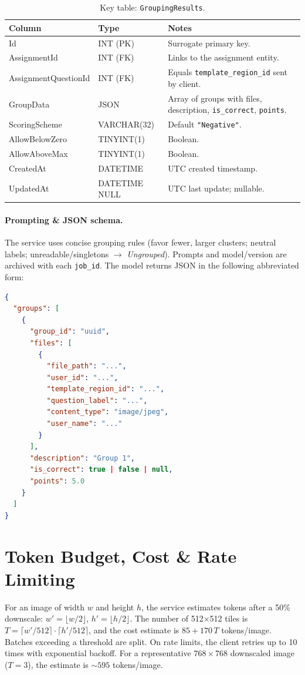 \documentclass[ms,twoside,print]{nuthesis}
\begin{document}
\begin{table}[H]
  \centering
  \caption{Key table: \texttt{GroupingResults}.}
  \label{tab:groupingresults}
  \setlength\tabcolsep{6pt}
  \renewcommand{\arraystretch}{1.2}
  \footnotesize
  \begin{tabularx}{\textwidth}{@{}L{4.3cm}L{2.8cm}Y@{}}
    \toprule
    \textbf{Column} & \textbf{Type} & \textbf{Notes} \\
    \midrule
    Id & INT (PK) & Surrogate primary key. \\
    AssignmentId & INT (FK) & Links to the assignment entity. \\
    AssignmentQuestionId & INT (FK) & Equals \texttt{template\_region\_id} sent by client. \\
    GroupData & JSON & Array of groups with files, description, \texttt{is\_correct}, \texttt{points}. \\
    ScoringScheme & VARCHAR(32) & Default \texttt{"Negative"}. \\
    AllowBelowZero & TINYINT(1) & Boolean. \\
    AllowAboveMax & TINYINT(1) & Boolean. \\
    CreatedAt & DATETIME & UTC created timestamp. \\
    UpdatedAt & DATETIME NULL & UTC last update; nullable. \\
    \bottomrule
  \end{tabularx}
\end{table}

\paragraph{Prompting \& JSON schema.}
The service uses concise grouping rules (favor fewer, larger clusters; neutral labels; unreadable/singletons $\rightarrow$ \emph{Ungrouped}). Prompts and model/version are archived with each \texttt{job\_id}. The model returns JSON in the following abbreviated form:
\begin{lstlisting}[language=json]
{
  "groups": [
    {
      "group_id": "uuid",
      "files": [
        {
          "file_path": "...",
          "user_id": "...",
          "template_region_id": "...",
          "question_label": "...",
          "content_type": "image/jpeg",
          "user_name": "..."
        }
      ],
      "description": "Group 1",
      "is_correct": true | false | null,
      "points": 5.0
    }
  ]
}
\end{lstlisting}

\section{Token Budget, Cost \& Rate Limiting}
For an image of width $w$ and height $h$, the service estimates tokens after a 50\% downscale: $w' = \lfloor w/2 \rfloor$, $h' = \lfloor h/2 \rfloor$. The number of 512$\times$512 tiles is $T=\lceil w'/512 \rceil\cdot\lceil h'/512 \rceil$, and the cost estimate is $85 + 170\,T$ tokens/image. Batches exceeding a threshold are split. On rate limits, the client retries up to 10 times with exponential backoff. For a representative $768\times 768$ downscaled image ($T=3$), the estimate is $\sim595$ tokens/image.
\end{document}
